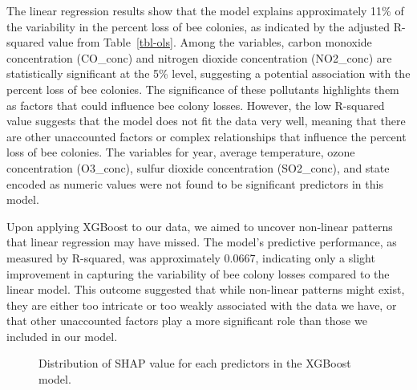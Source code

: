 \documentclass[
  letterpaper,
  DIV=11,
  numbers=noendperiod]{scrartcl}
\begin{document}
\begin{table}
{}

\end{table}%

The linear regression results show that the model explains approximately
11\% of the variability in the percent loss of bee colonies, as
indicated by the adjusted R-squared value from Table~\ref{tbl-ols}.
Among the variables, carbon monoxide concentration (CO\_conc) and
nitrogen dioxide concentration (NO2\_conc) are statistically significant
at the 5\% level, suggesting a potential association with the percent
loss of bee colonies. The significance of these pollutants highlights
them as factors that could influence bee colony losses. However, the low
R-squared value suggests that the model does not fit the data very well,
meaning that there are other unaccounted factors or complex
relationships that influence the percent loss of bee colonies. The
variables for year, average temperature, ozone concentration (O3\_conc),
sulfur dioxide concentration (SO2\_conc), and state encoded as numeric
values were not found to be significant predictors in this model.

Upon applying XGBoost to our data, we aimed to uncover non-linear
patterns that linear regression may have missed. The model's predictive
performance, as measured by R-squared, was approximately 0.0667,
indicating only a slight improvement in capturing the variability of bee
colony losses compared to the linear model. This outcome suggested that
while non-linear patterns might exist, they are either too intricate or
too weakly associated with the data we have, or that other unaccounted
factors play a more significant role than those we included in our
model.

\begin{figure}


\caption{\label{fig-shap\_train}Distribution of SHAP value for each
predictors in the XGBoost model.}

\end{figure}%
\end{document}
